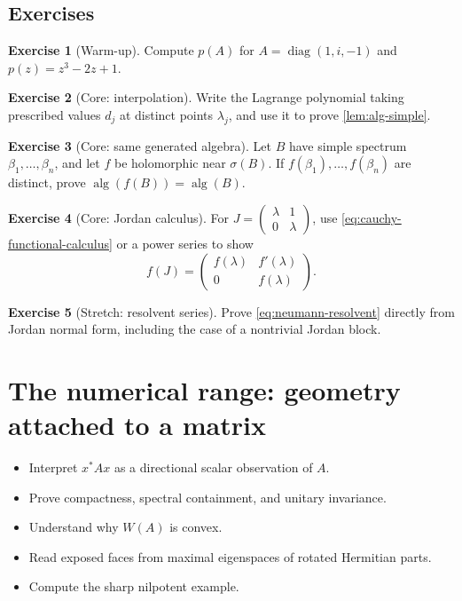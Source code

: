 \documentclass[11pt,oneside,openany]{book}
\theoremstyle{definition}
\newtheorem{exercise}{Exercise}[chapter]
\theoremstyle{remark}
\newcommand{\alg}{\operatorname{alg}}
\newcommand{\diag}{\operatorname{diag}}
\newcommand{\spec}{\sigma}
\begin{document}
\section{Exercises}

\begin{exercise}[Warm-up]
Compute \(p(A)\) for
\(
A=\diag(1,i,-1)
\)
and \(p(z)=z^3-2z+1\).
\end{exercise}

\begin{exercise}[Core: interpolation]
\label{ex:lagrange}
Write the Lagrange polynomial taking prescribed values \(d_j\) at
distinct points \(\lambda_j\), and use it to prove
\cref{lem:alg-simple}.
\end{exercise}

\begin{exercise}[Core: same generated algebra]
\label{ex:same-algebra}
Let \(B\) have simple spectrum \(\beta_1,\ldots,\beta_n\), and let
\(f\) be holomorphic near \(\spec(B)\).  If
\(f(\beta_1),\ldots,f(\beta_n)\) are distinct, prove
\(\alg(f(B))=\alg(B)\).
\end{exercise}

\begin{exercise}[Core: Jordan calculus]
For \(J=\begin{pmatrix}\lambda&1\\0&\lambda\end{pmatrix}\), use
\eqref{eq:cauchy-functional-calculus} or a power series to show
\[
  f(J)=\begin{pmatrix}f(\lambda)&f'(\lambda)\\0&f(\lambda)\end{pmatrix}.
\]
\end{exercise}

\begin{exercise}[Stretch: resolvent series]
Prove \eqref{eq:neumann-resolvent} directly from Jordan normal form,
including the case of a nontrivial Jordan block.
\end{exercise}

\chapter{The numerical range: geometry attached to a matrix}
\label{ch:numerical-range}

\begin{learninggoals}
\begin{itemize}
  \item Interpret \(x^*Ax\) as a directional scalar observation of \(A\).
  \item Prove compactness, spectral containment, and unitary invariance.
  \item Understand why \(W(A)\) is convex.
  \item Read exposed faces from maximal eigenspaces of rotated Hermitian
  parts.
  \item Compute the sharp nilpotent example.
\end{itemize}
\end{learninggoals}
\end{document}
